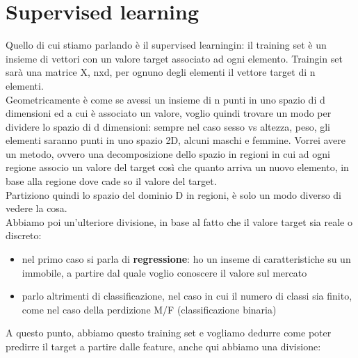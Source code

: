 \documentclass[12pt, oneside]{extbook}
\begin{document}
\section{Supervised learning}
Quello di cui stiamo parlando è il supervised learningin: il training set è un insieme di vettori con un valore target associato ad ogni elemento. Traingin set sarà una matrice X, nxd, per ognuno degli elementi il vettore target di n elementi.\\Geometricamente è come se avessi un insieme di n punti in uno spazio di d dimensioni ed a cui è associato un valore, voglio quindi trovare un modo per dividere lo spazio di d dimensioni: sempre nel caso sesso vs altezza, peso, gli elementi saranno punti in uno spazio 2D, alcuni maschi e femmine. Vorrei avere un metodo, ovvero una decomposizione dello spazio in regioni in cui ad ogni regione associo un valore del target così che quanto arriva un nuovo elemento, in base alla regione dove cade so il valore del target.\\Partiziono quindi lo spazio del dominio D in regioni, è solo un modo diverso di vedere la cosa.\\Abbiamo poi un'ulteriore divisione, in base al fatto che il valore target sia reale o discreto:
\begin{itemize}
	\item nel primo caso si parla di \textbf{regressione}: ho un inseme di caratteristiche su un immobile, a partire dal quale voglio conoscere il valore sul mercato
	\item parlo altrimenti di classificazione, nel caso in cui il numero di classi sia finito, come nel caso della perdizione M/F (classificazione binaria)
\end{itemize}
A questo punto, abbiamo questo training set e vogliamo dedurre come poter predirre il target a partire dalle feature, anche qui abbiamo una divisione:
\end{document}
